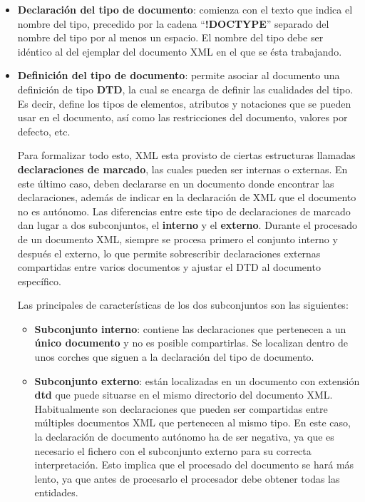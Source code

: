 \begin{itemize}
    \item \textbf{Declaración del tipo de documento}: comienza con el texto que indica el nombre del tipo, precedido por la cadena ``\textbf{!DOCTYPE}'' separado del nombre del tipo por al menos un espacio. El nombre del tipo debe ser idéntico al del ejemplar del documento XML en el que se ésta trabajando.

    \item \textbf{Definición del tipo de documento}: permite asociar al documento una definición de tipo \textbf{DTD}, la cual se encarga de definir las cualidades del tipo. Es decir, define los tipos de elementos, atributos y notaciones que se pueden usar en el documento, así como las restricciones del documento, valores por defecto, etc.

    Para formalizar todo esto, XML esta provisto de ciertas estructuras llamadas \textbf{declaraciones de marcado}, las cuales pueden ser internas o externas. En este último caso, deben declararse en un documento donde encontrar las declaraciones, además de indicar en la declaración de XML que el documento no es autónomo. Las diferencias entre este tipo de declaraciones de marcado dan lugar a dos subconjuntos, el \textbf{interno} y el \textbf{externo}. Durante el procesado de un documento XML, siempre se procesa primero el conjunto interno y después el externo, lo que permite sobrescribir declaraciones externas compartidas entre varios documentos y ajustar el DTD al documento específico.

    Las principales de características de los dos subconjuntos son las siguientes:

    \begin{itemize}
        \item \textbf{Subconjunto interno}: contiene las declaraciones que pertenecen a un \textbf{único documento} y no es posible compartirlas. Se localizan dentro de unos corches que siguen a la declaración del tipo de documento.

        \item \textbf{Subconjunto externo}: están localizadas en un documento con extensión \textbf{dtd} que puede situarse en el mismo directorio del documento XML. Habitualmente son declaraciones que pueden ser compartidas entre múltiples documentos XML que pertenecen al mismo tipo. En este caso, la declaración de documento autónomo ha de ser negativa, ya que es necesario el fichero con el subconjunto externo para su correcta interpretación. Esto implica que el procesado del documento se hará más lento, ya que antes de procesarlo el procesador debe obtener todas las entidades.


\end{itemize}
\end{itemize}
